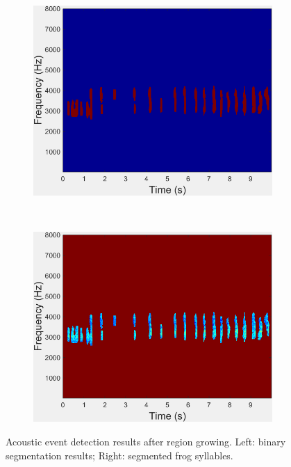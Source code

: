 \begin{figure}[htb!]
\centering
        \begin{subfigure}[b]{0.45\textwidth}
                \includegraphics[width=\textwidth]{image/Ch6/binary.png}
        \end{subfigure}
       ~
              \begin{subfigure}[b]{0.45\textwidth}
                \includegraphics[width=\textwidth]{image/Ch6/segmentEvents.png}                
        \end{subfigure}       
\caption[Acoustic event detection results after region growing]{Acoustic event detection results after region growing. Left: binary segmentation results; Right: segmented frog syllables.}
        \label{fig:Ch6_AED}
\end{figure}



